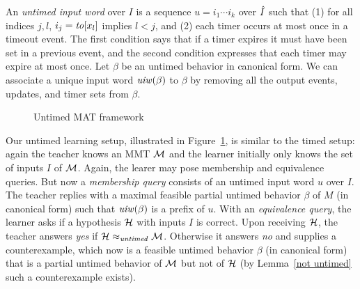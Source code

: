 An \emph{untimed input word} over $I$ is a sequence $u = i_1 \cdots i_k$ over $\hat{I}$ such that (1)
for all indices $j, l$, $i_j = \mathit{to}[x_l]$ implies $l < j$, and (2) each timer occurs at most once in a timeout event.
The first condition  says that if a timer expires it must have been set in a previous event, and the second condition  expresses that
each timer may expire at most once.
Let $\beta$ be an untimed behavior in canonical form.
We can associate a unique input word $\mathit{uiw}(\beta)$ to $\beta$ by removing all the output events,
updates, and timer sets from $\beta$.
\begin{figure}
\begin{center}
\end{center}    
\caption{Untimed MAT framework}
\label{fig:untimed MAT}
\end{figure}

Our untimed learning setup, illustrated in Figure~\ref{fig:untimed MAT}, is similar to the timed setup:
again the teacher knows an MMT ${\mathcal M}$ and the learner initially only knows the set of inputs $I$ of ${\mathcal M}$.
Again, the learer may pose membership and equivalence queries.
But now a \emph{membership query} consists of an untimed input word $u$ over $I$.
The teacher replies with a maximal feasible partial untimed behavior $\beta$ of $M$ (in canonical form) such that
$\mathit{uiw}(\beta)$ is a prefix of $u$.
With an \emph{equivalence query}, the learner asks if a hypothesis ${\mathcal H}$ with inputs $I$ is correct.
Upon receiving ${\mathcal H}$, the teacher answers \emph{yes} if ${\mathcal H} \approx_{\mathit{untimed}} {\mathcal M}$.
Otherwise it answers \emph{no} and supplies a counterexample, which now is a feasible untimed behavior $\beta$ (in canonical form) that
is a partial untimed behavior of ${\mathcal M}$ but not of ${\mathcal H}$ (by Lemma~\ref{not untimed} such a counterexample exists).

